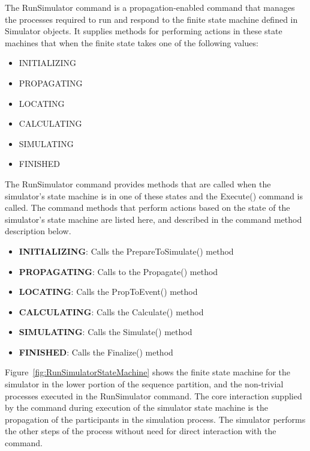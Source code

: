 The RunSimulator command is a propagation-enabled command that manages the processes required to run and respond to the finite state machine defined in Simulator objects.  It supplies methods for performing actions in these state machines that when the finite state takes one of the following values:

\begin{itemize}
\item INITIALIZING
\item PROPAGATING
\item LOCATING
\item CALCULATING
\item SIMULATING
\item FINISHED
\end{itemize}

The RunSimulator command provides methods that are called when the simulator's state machine is in
one of these states and the Execute() command is called.  The command methods that perform actions
based on the state of the simulator's state machine are listed here, and described in the command
method description below.

\begin{itemize}
\item \textbf{INITIALIZING}:  Calls the PrepareToSimulate() method
\item \textbf{PROPAGATING}:  Calls to the Propagate() method
\item \textbf{LOCATING}:  Calls the PropToEvent() method
\item \textbf{CALCULATING}:  Calls the Calculate() method
\item \textbf{SIMULATING}:  Calls the Simulate() method
\item \textbf{FINISHED}:  Calls the Finalize() method
\end{itemize}

Figure~\ref{fig:RunSimulatorStateMachine} shows the finite state machine for the simulator in the lower portion of the sequence partition, and the non-trivial processes executed in the RunSimulator command.  The core interaction supplied by the command during execution of the simulator state machine is the propagation of the participants in the simulation process.  The simulator performs the other steps of the process without need for direct interaction with the command.

